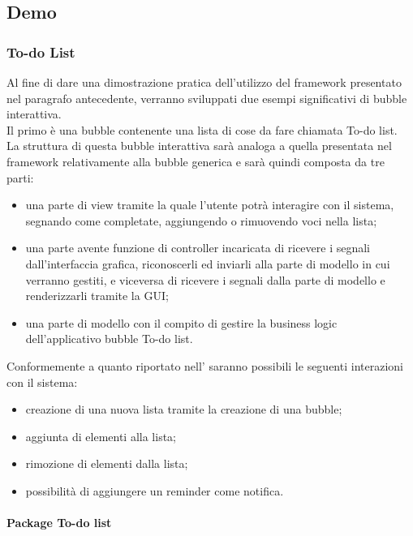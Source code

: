 \subsection{Demo}

\subsubsection{To-do List} \label{todo-list}
Al fine di dare una dimostrazione pratica dell'utilizzo del framework presentato nel paragrafo antecedente, verranno sviluppati due esempi significativi di bubble interattiva.\\
Il primo è una bubble contenente una lista di cose da fare chiamata To-do list.\\
La struttura di questa bubble interattiva sarà analoga a quella presentata nel framework relativamente alla bubble generica e sarà quindi composta da tre parti:
\begin{itemize}
	\item una parte di view tramite la quale l'utente potrà interagire con il sistema, segnando come completate, aggiungendo o rimuovendo voci nella lista;
	\item una parte avente funzione di controller incaricata di ricevere i segnali dall'interfaccia grafica, riconoscerli ed inviarli alla parte di modello in cui verranno gestiti, e viceversa di ricevere i segnali dalla parte di modello e renderizzarli tramite la GUI;
	\item una parte di modello con il compito di gestire la business logic dell'applicativo bubble To-do list.
\end{itemize}
Conformemente a quanto riportato nell'\AnalisiDeiRequisiti{} saranno possibili le seguenti interazioni con il sistema:
\begin{itemize}
	\item creazione di una nuova lista tramite la creazione di una bubble;
	\item aggiunta di elementi alla lista;
	\item rimozione di elementi dalla lista;
	\item possibilità di aggiungere un reminder come notifica.
\end{itemize}

\paragraph{Package To-do list}\mbox{}\\

